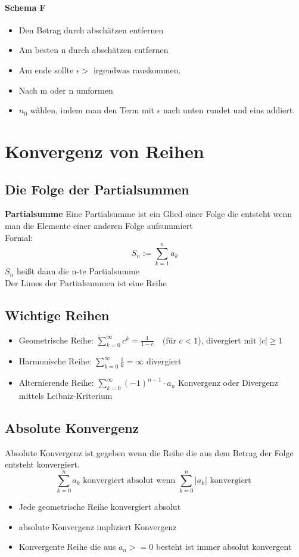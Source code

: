 \documentclass[12pt,a4paper]{article}
\begin{document}
\paragraph{Schema F}
\begin{itemize}
	\item Den Betrag durch abschätzen entfernen
	\item Am besten n durch abschätzen entfernen
	\item Am ende sollte $\epsilon>\text{ irgendwas}$ rauskommen.
	\item Nach m oder n umformen
	\item $n_0$ wählen, indem man den Term mit $\epsilon$ nach unten rundet und eins addiert.
\end{itemize}
\pagebreak

\section{Konvergenz von Reihen}
\subsection{Die Folge der Partialsummen}
\textbf{Partialsumme}
Eine Partialsumme ist ein Glied einer Folge die entsteht wenn man die Elemente einer anderen Folge aufsummiert\\
Formal: \[S_n :=\sum_{k=1}^{n}a_k\]
$S_n$ heißt dann die n-te Partialsumme\\
Der Limes der Partialsummen ist eine Reihe\\
\subsection{Wichtige Reihen}
\begin{itemize}
	\item Geometrische Reihe: $\sum_{k=0}^\infty c^k=\frac{1}{1-c}\quad\text{(für }c<1$), divergiert mit $|c|\geq 1$
	\item Harmonische Reihe: $\sum_{k=0}^\infty \frac{1}{k}=\infty$ divergiert
	\item Alternierende Reihe: $\sum_{k=0}^\infty (-1)^{n-1}\cdot a_n$ Konvergenz oder Divergenz mittels Leibniz-Kriterium
\end{itemize}

\subsection{Absolute Konvergenz}
Absolute Konvergenz ist gegeben wenn die Reihe die aus dem Betrag der Folge entsteht konvergiert.\\
\[\sum_{k=0}^n a_k \text{ konvergiert absolut wenn } \sum_{k=0}^n |a_k| \text{ konvergiert }\]
\begin{itemize}
	\item Jede geometrische Reihe konvergiert absolut
	\item absolute Konvergenz impliziert Konvergenz
	\item Konvergente Reihe die aus $a_n>=0$ besteht ist immer absolut konvergent
\end{itemize}
\end{document}
